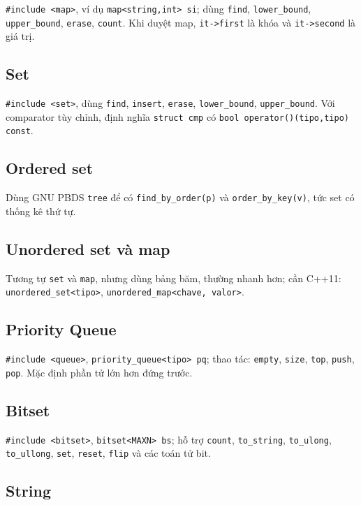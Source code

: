 \documentclass[11pt]{article}
\begin{document}
\texttt{\#include <map>}, ví dụ \texttt{map<string,int> si}; dùng \texttt{find}, \texttt{lower\_bound}, \texttt{upper\_bound}, \texttt{erase}, \texttt{count}. Khi duyệt map, \texttt{it->first} là khóa và \texttt{it->second} là giá trị.

\subsection{Set}

\texttt{\#include <set>}, dùng \texttt{find}, \texttt{insert}, \texttt{erase}, \texttt{lower\_bound}, \texttt{upper\_bound}. Với comparator tùy chỉnh, định nghĩa \texttt{struct cmp} có \texttt{bool operator()(tipo,tipo) const}.

\subsection{Ordered set}

Dùng GNU PBDS \texttt{tree} để có \texttt{find\_by\_order(p)} và \texttt{order\_by\_key(v)}, tức set có thống kê thứ tự.

\subsection{Unordered set và map}

Tương tự \texttt{set} và \texttt{map}, nhưng dùng bảng băm, thường nhanh hơn; cần C++11: \texttt{unordered\_set<tipo>}, \texttt{unordered\_map<chave, valor>}.

\subsection{Priority Queue}

\texttt{\#include <queue>}, \texttt{priority\_queue<tipo> pq}; thao tác: \texttt{empty}, \texttt{size}, \texttt{top}, \texttt{push}, \texttt{pop}. Mặc định phần tử lớn hơn đứng trước.

\subsection{Bitset}

\texttt{\#include <bitset>}, \texttt{bitset<MAXN> bs}; hỗ trợ \texttt{count}, \texttt{to\_string}, \texttt{to\_ulong}, \texttt{to\_ullong}, \texttt{set}, \texttt{reset}, \texttt{flip} và các toán tử bit.

\subsection{String}
\end{document}
